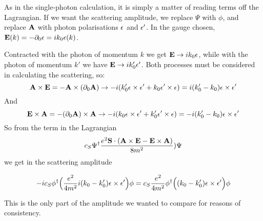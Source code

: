 As in the single-photon calculation, it is simply a matter of reading terms off the Lagrangian.  If we want the scattering amplitude, we replace $\Psi$ with $\phi$, and replace $\mathbf{A}$ with photon polarisations $\epsilon$ and $\epsilon'$.  In the gauge chosen, $\mathbf{E}(k) = -\partial_0 \mathbf{\epsilon} = i k_0 \mathbf{\epsilon}(k)$.

Contracted with the photon of momentum $k$ we get $\mathbf{E} \to i k_0 \mathbf{\epsilon}$, while with the photon of momentum $k'$ we have $\mathbf{E} \to i k'_0 \mathbf{\epsilon'}$.  Both processes must be considered in calculating the scattering, so:
\[
	\mathbf{A} \times \mathbf{E} = - \mathbf{A} \times (\partial_0 \mathbf{A})
		\to 
	-i(k_0' \mathbf{\epsilon} \times \mathbf{\epsilon'} + k_0 \mathbf{\epsilon'} \times \mathbf{\epsilon} ) = i ( k_0' - k_0) \mathbf{\epsilon} \times \mathbf{\epsilon'}
\]
And
\[
	\mathbf{E} \times \mathbf{A} = - (\partial_0 \mathbf{A}) \times  \mathbf{A}
		\to 
	-i( k_0 \mathbf{\epsilon} \times \mathbf{\epsilon'} + k_0' \mathbf{\epsilon'} \times \mathbf{\epsilon} ) = -i ( k_0' - k_0) \mathbf{\epsilon} \times \mathbf{\epsilon'}
\]
So from the term in the Lagrangian 
\[
 c_S \Psi^\dagger \frac{ e^2 \mathbf{S} \cdot ( \mathbf{A} \times \mathbf{E} - \mathbf{E} \times \mathbf{A} )}{8m^2} ) \Psi
\]
we get in the scattering amplitude

\[
  -i c_S \phi^\dagger  \Big ( \frac{e^2}{4m^2}    i(k_0 - k_0')    \mathbf{\epsilon} \times \mathbf{\epsilon'} \Big ) \phi
	=
     c_S \frac{e^2}{4m^2} \phi^\dagger  \Big ( (k_0 - k_0')    \mathbf{\epsilon} \times \mathbf{\epsilon'} \Big ) \phi
\]

This is the only part of the amplitude we wanted to compare for reasons of consistency.
